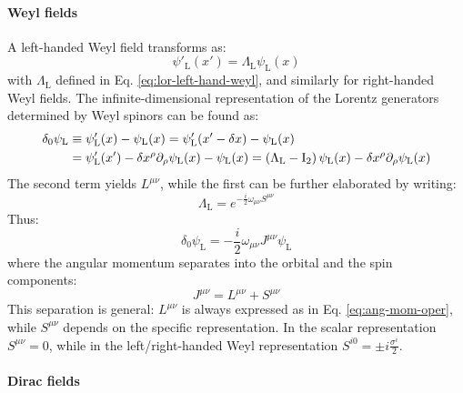 \paragraph{Weyl fields}

A left-handed Weyl field transforms as:
\begin{equation}
  \psi'_\text{L}(x') = \Lambda_\text{L} \psi_\text{L}(x)
\end{equation}
with $ \Lambda_\text{L} $ defined in Eq. \ref{eq:lor-left-hand-weyl}, and similarly for right-handed Weyl fields. The infinite-dimensional representation of the Lorentz generators determined by Weyl spinors can be found as:
\begin{equation*}
  \begin{split}
    \delta_0 \psi_\text{L} &\equiv \psi'_\text{L}(x) - \psi_\text{L}(x) = \psi'_\text{L}(x' - \delta x) - \psi_\text{L}(x) \\
                           &= \psi'_\text{L}(x') - \delta x^\rho \partial_\rho \psi_\text{L}(x) - \psi_\text{L}(x) = \left( \Lambda_\text{L} - \mathrm{I}_2 \right) \psi_\text{L}(x) - \delta x^\rho \partial_\rho \psi_\text{L}(x)
  \end{split}
\end{equation*}
The second term yields $ L^{\mu \nu} $, while the first can be further elaborated by writing:
\begin{equation}
  \Lambda_\text{L} = e^{-\frac{i}{2} \omega_{\mu \nu} S^{\mu \nu}}
\end{equation}
Thus:
\begin{equation*}
  \delta_0 \psi_\text{L} = - \frac{i}{2} \omega_{\mu \nu} J^{\mu \nu} \psi_\text{L}
\end{equation*}
where the angular momentum separates into the orbital and the spin components:
\begin{equation}
  J^{\mu \nu} = L^{\mu \nu} + S^{\mu \nu}
\end{equation}
This separation is general: $ L^{\mu \nu} $ is always expressed as in Eq. \ref{eq:ang-mom-oper}, while $ S^{\mu \nu} $ depends on the specific representation. In the scalar representation $ S^{\mu \nu} = 0 $, while in the left/right-handed Weyl representation $ S^{i0} = \pm i \frac{\sigma^i}{2} $.

\paragraph{Dirac fields}

